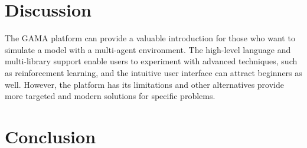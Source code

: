 \documentclass[a4paper,10pt]{article}
\begin{document}
\section{Discussion}
The GAMA platform can provide a valuable introduction for those who want to simulate a model with a multi-agent environment. The high-level language and multi-library support enable users to experiment with advanced techniques, such as reinforcement learning, and the intuitive user interface can attract beginners as well. However, the platform has its limitations and other alternatives provide more targeted and modern solutions for specific problems. 
\section{Conclusion}
\end{document}
